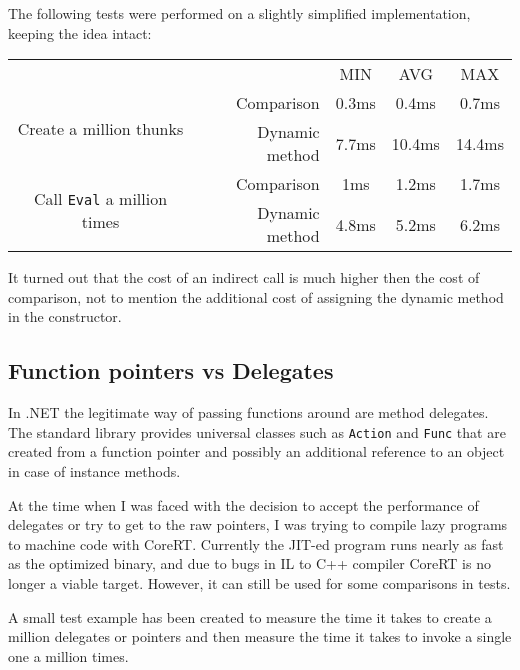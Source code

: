 \documentclass[en]{pracamgr}
\begin{document}
The following tests were performed on a slightly simplified
implementation, keeping the idea intact:

\begin{center}
\begin{tabular}{c r c c c}
    & & MIN & AVG & MAX \\
    \cline{3-5}

    \multirow{2}{*}{Create a million thunks}
    & Comparison & 0.3ms & 0.4ms & 0.7ms \\
    & Dynamic method & 7.7ms & 10.4ms & 14.4ms \\
    \cline{2-5}

    \multirow{2}{*}{Call \texttt{Eval} a million times} 
    & Comparison & 1ms & 1.2ms & 1.7ms \\
    & Dynamic method & 4.8ms & 5.2ms & 6.2ms \\
    
\end{tabular}
\end{center}

It turned out that the cost of an indirect call is much higher then the cost of comparison, not to mention the additional cost of assigning the dynamic method in the constructor.

\subsection{Function pointers vs Delegates}\label{perf:fun_pointers}

In .NET the legitimate way of passing functions around
are method delegates. The standard library provides
universal classes such as \texttt{Action} and \texttt{Func}
that are created from a function pointer and possibly
an additional reference to an object in case of instance methods.

At the time when I was faced with the decision to accept
the performance of delegates or try to get to the raw pointers,
I was trying to compile lazy programs to machine code with
CoreRT. Currently the JIT-ed program runs nearly as fast as
the optimized binary, and due to bugs in IL to C++ compiler
CoreRT is no longer a viable target.
However, it can still be used for some comparisons in tests.

A small test example has been created to measure the time
it takes to create a million delegates or pointers and then measure the time it takes to invoke a single one a million times.
\end{document}
